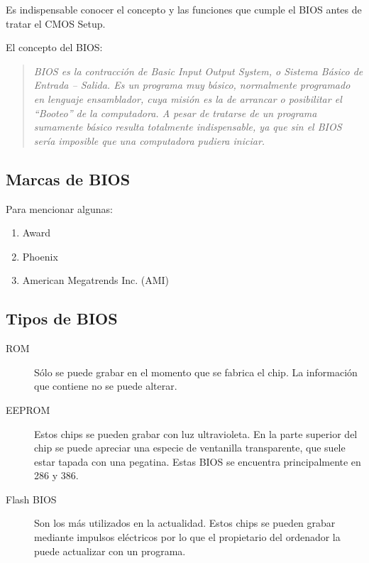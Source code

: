 \documentclass[12pt,oneside,a4paper]{article}
\begin{document}
	Es indispensable conocer el concepto y las funciones que cumple el BIOS antes de tratar el CMOS Setup.

	El concepto del BIOS:
	\begin{quotation}

		{\em BIOS es la contracción de Basic Input Output System, o Sistema Básico de
		Entrada – Salida. 
		Es un programa muy básico, normalmente programado en lenguaje ensamblador,
		cuya misión es la de arrancar o posibilitar el “Booteo” de la computadora.
		A pesar de tratarse de un programa sumamente básico resulta totalmente
		indispensable, ya que sin el BIOS sería imposible que una computadora pudiera
		iniciar.}

	\end{quotation}
			
	\subsection{Marcas de BIOS}\label{sub:marcas de bios}
		Para mencionar algunas:
		\begin{enumerate}
			\item Award
			\item Phoenix
			\item American Megatrends Inc. (AMI)
		\end{enumerate}
	
	\subsection{Tipos de BIOS}\label{sub:chips bios}
		
		\begin{description}
			\item[ROM] Sólo se puede grabar en el momento que se fabrica el
				chip. La información que contiene no se puede alterar.
			\item[EEPROM] Estos chips se pueden grabar con luz ultravioleta. En
				la parte superior del chip se puede apreciar una especie de
				ventanilla transparente, que suele estar tapada con una
				pegatina. Estas BIOS se encuentra principalmente en 286 y 386.
				\cite{EEPROM}
			\item[Flash BIOS] Son los más utilizados en la actualidad. Estos
				chips se pueden grabar mediante impulsos eléctricos por lo que
				el propietario del ordenador la puede actualizar con un
				programa.
		\end{description}

		\newpage
\end{document}
